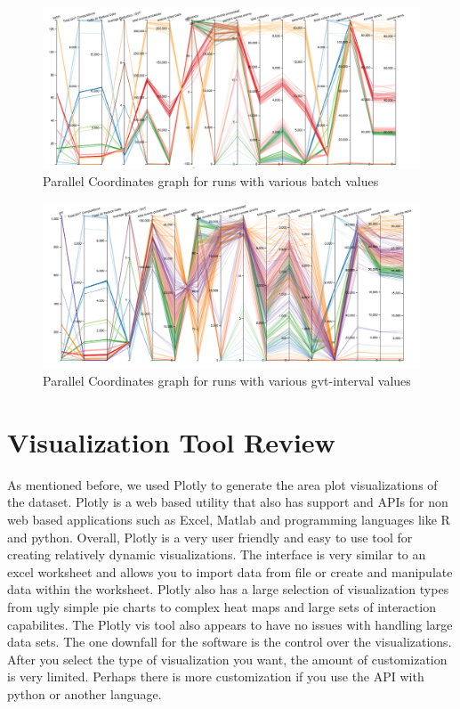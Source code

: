 \documentclass[12pt]{article}
\begin{document}
\begin{figure}[ht]
\centering
	\includegraphics[width=7in]{figures/batch.png}
\caption{Parallel Coordinates graph for runs with various batch values}
\label{fig:batch}
\end{figure}
\begin{figure}[ht]
\centering
	\includegraphics[width=7in]{figures/gvt.png}
\caption{Parallel Coordinates graph for runs with various gvt-interval values}
\label{fig:gvt}
\end{figure}

\section{Visualization Tool Review}
As mentioned before, we used Plotly to generate the area plot visualizations of the dataset. Plotly is a web based utility that also has support and APIs for non web based applications such as Excel, Matlab and programming languages like R and python. Overall, Plotly is a very user friendly and easy to use tool for creating relatively dynamic visualizations. The interface is very similar to an excel worksheet and allows you to import data from file or create and manipulate data within the worksheet. Plotly also has a large selection of visualization types from ugly simple pie charts to complex heat maps and large sets of interaction capabilites. The Plotly vis tool also appears to have no issues with handling large data sets. The one downfall for the software is the control over the visualizations. After you select the type of visualization you want, the amount of customization is very limited. Perhaps there is more customization if you use the API with python or another language. 
\end{document}
